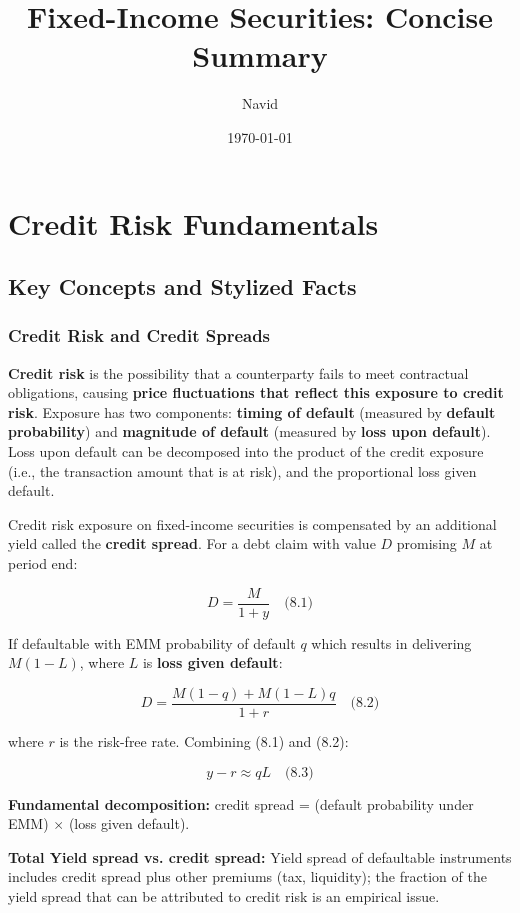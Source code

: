 \documentclass[12pt,a4paper]{article}
\title{Fixed-Income Securities: Concise Summary}
\author{Navid}
\date{\today}
\begin{document}
\setlength{\parindent}{0pt}

\maketitle
\tableofcontents




\section{Credit Risk Fundamentals}

\subsection{Key Concepts and Stylized Facts}

\subsubsection{Credit Risk and Credit Spreads}

\textbf{Credit risk} is the possibility that a counterparty fails to meet contractual obligations, causing \textbf{price fluctuations that reflect this exposure to credit risk}. Exposure has two components: \textbf{timing of default} (measured by \textbf{default probability}) and \textbf{magnitude of default} (measured by \textbf{loss upon default}). Loss upon default can be decomposed into the product of the credit exposure (i.e., 
the transaction amount that is at risk), and the proportional loss given default.

Credit risk exposure on fixed-income securities is compensated by an additional yield called the \textbf{credit spread}. For a debt claim with value $D$ promising $M$ at period end: 

$$D = \frac{M}{1 + y} \quad \text{(8.1)}$$

If defaultable with EMM probability of default $q$ which results in delivering $M(1-L)$, where $L$ is \textbf{loss given default}:

$$D = \frac{M(1-q) + M(1-L)q}{1 + r} \quad \text{(8.2)}$$

where $r$ is the risk-free rate. Combining (8.1) and (8.2):

$$y - r \approx qL \quad \text{(8.3)}$$

\textbf{Fundamental decomposition:} credit spread = (default probability under EMM) $\times$ (loss given default).

\textbf{Total Yield spread vs. credit spread:} Yield spread of defaultable instruments includes credit spread plus other premiums (tax, liquidity); the fraction of the yield spread that can be attributed to credit risk is an empirical issue.
\end{document}
